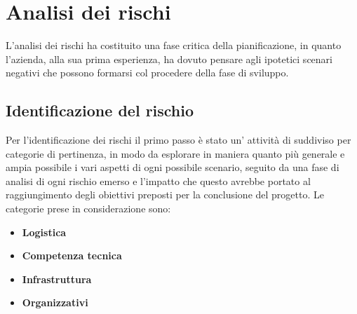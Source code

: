 \documentclass{scalatekids-article}
\begin{document}
\section{Analisi dei rischi}
L'analisi dei rischi ha costituito una fase critica della pianificazione, in
quanto l'azienda, alla sua prima esperienza, ha dovuto pensare agli ipotetici
scenari negativi che possono formarsi col procedere della fase di sviluppo.
\subsection{Identificazione del rischio}
Per l'identificazione dei rischi il primo passo è stato un' attività di
 suddiviso per categorie di pertinenza, in modo da esplorare
in maniera quanto più generale e ampia possibile i vari aspetti di ogni
possibile scenario, seguito da una fase di analisi di ogni rischio emerso e
l'impatto che questo avrebbe portato al raggiungimento degli obiettivi preposti
per la conclusione del progetto. Le categorie prese in considerazione sono:
\begin{itemize}
\item\textbf{Logistica}
\item\textbf{Competenza tecnica}
\item\textbf{Infrastruttura}
\item\textbf{Organizzativi}
\end{itemize}
\end{document}
